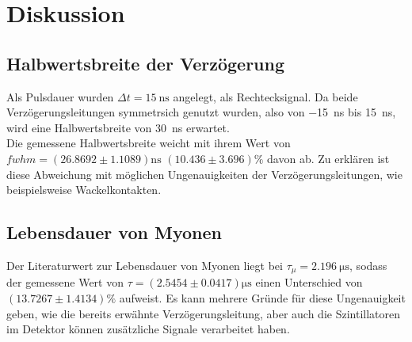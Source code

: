 \newpage
\section{Diskussion}
\label{sec:diskussion}

\subsection{Halbwertsbreite der Verzögerung}
Als Pulsdauer wurden $\Delta t = \SI{15}{\nano\second}$ angelegt, als Rechtecksignal.
Da beide Verzögerungsleitungen symmetrsich genutzt wurden, also von \SI{-15}{\nano\second} bis \SI{15}{\nano\second}, wird eine Halbwertsbreite von \SI{30}{\nano\second} erwartet.\\
Die gemessene Halbwertsbreite weicht mit ihrem Wert von $fwhm = \left(26.8692\pm1.1089\right)\si{\nano\second}$ $\left(10.436\pm3.696\right)\%$ davon ab.
Zu erklären ist diese Abweichung mit möglichen Ungenauigkeiten der Verzögerungsleitungen, wie beispielsweise Wackelkontakten.

\subsection{Lebensdauer von Myonen}
Der Literaturwert zur Lebensdauer von Myonen liegt bei $\tau_{\mu} = \SI{2.196}{\micro\second}$, sodass der gemessene Wert von $\tau = \left(2.5454 \pm 0.0417\right)\si{\micro\second}$ einen Unterschied von $\left(13.7267\pm1.4134\right)\%$ aufweist.
Es kann mehrere Gründe für diese Ungenauigkeit geben, wie die bereits erwähnte Verzögerungsleitung, aber auch die Szintillatoren im Detektor können zusätzliche Signale verarbeitet haben.
